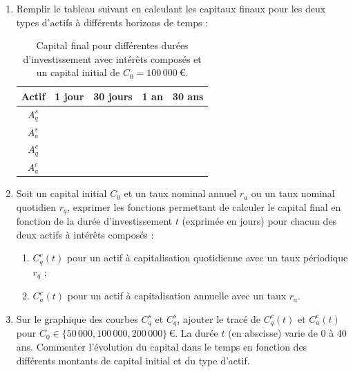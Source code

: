 \documentclass{article}
\begin{document}
\begin{enumerate}[label=\textbf{Q1.\arabic*}]
\begin{enumerate}[label=\textbf{Q2.\arabic*}]
	      	      
	      	\item Remplir le tableau suivant en calculant les capitaux finaux pour les deux types d'actifs à différents horizons de temps :\\
	      	      \begin{table}[h!]
	      	      	\centering
	      	      	\begin{tabular}{|c|c|c|c|c|}
	      	      		\hline
	      	      		\textbf{Actif} & \textbf{1 jour} & \textbf{30 jours} & \textbf{1 an} & \textbf{30 ans} \\
	      	      		\hline
	      	      		\( A_q^s \)    &                 &                   &               &                 \\
	      	      		\hline
	      	      		\( A_a^s \)    &                 &                   &               &                 \\
	      	      		\hline
	      	      		\( A_q^c \)    &                 &                   &               &                 \\
	      	      		\hline
	      	      		\( A_a^c \)    &                 &                   &               &                 \\
	      	      		\hline
	      	      	\end{tabular}
	      	      	\caption{Capital final pour différentes durées d'investissement avec intérêts composés et un capital initial de \( C_0 = 100\,000\ \text{€} \).}
	      	      	\label{tab:simple_interest_results}
	      	      \end{table}
	      	      
	      	\item Soit un capital initial \( C_0 \) et un taux nominal annuel \( r_a \) ou un taux nominal quotidien \( r_q \), exprimer les fonctions permettant de calculer le capital final en fonction de la durée d'investissement \( t \) (exprimée en jours) pour chacun des deux actifs à intérêts composés :
	      	      \begin{enumerate}[label=(\alph*)]
	      	      	\item \( C^c_q(t) \) pour un actif à capitalisation quotidienne avec un taux périodique \( r_q \) ;
	      	      	\item \( C^c_a(t) \) pour un actif à capitalisation annuelle avec un taux \( r_a \).
	      	      \end{enumerate}
	      	          
	      	\item Sur le graphique des courbes $C^s_q$ et $C^s_q$, ajouter le tracé de \( C^c_q(t) \) et \( C^c_a(t) \) pour \( C_0 \in \{50\,000, 100\,000, 200\,000\} \, \text{€} \). La durée \( t \) (en abscisse) varie de 0 à 40 ans. Commenter l'évolution du capital dans le temps en fonction des différents montants de capital initial et du type d'actif.
	      	          

\end{enumerate}
\end{enumerate}
\end{document}
